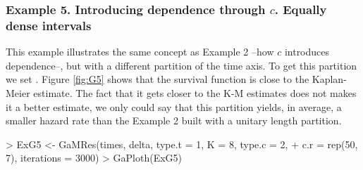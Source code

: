 \documentclass[letterpaper]{article}
\begin{document}
\subsubsection{Example 5. Introducing dependence through $c$. Equally dense intervals}

This example illustrates the same concept as Example 2 --how $c$ introduces dependence--, but with a different partition of the time axis. To get this partition we set . Figure \ref{fig:G5} shows that the survival function is close to the Kaplan-Meier estimate. The fact that it gets closer to the K-M estimates does not makes it a better estimate, we only could say that this partition yields, in average, a smaller hazard rate than the Example 2 built with a unitary length partition.

\begin{Schunk}
\begin{Sinput}
> ExG5 <- GaMRes(times, delta, type.t = 1, K = 8, type.c = 2, 
+                c.r = rep(50, 7), iterations = 3000)
> GaPloth(ExG5)
\end{Sinput}
\end{Schunk}
\end{document}
